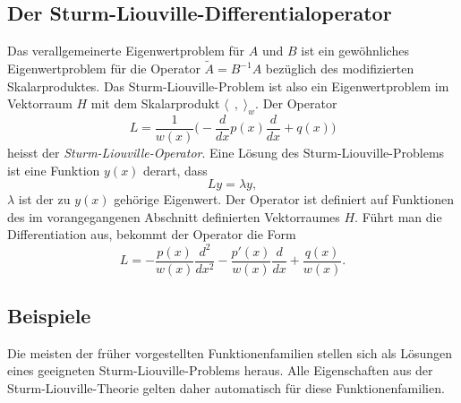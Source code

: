 %
%
\subsection{Der Sturm-Liouville-Differentialoperator}
Das verallgemeinerte Eigenwertproblem für $A$ und $B$ ist ein
gewöhnliches Eigenwertproblem für die Operator $\tilde{A}=B^{-1}A$
bezüglich des modifizierten Skalarproduktes.
Das Sturm-Liouville-Problem ist also ein Eigenwertproblem im
Vektorraum $H$ mit dem Skalarprodukt $\langle\,\;,\;\rangle_w$.
Der Operator
\begin{equation}
L = \frac{1}{w(x)} \biggl(-\frac{d}{dx} p(x)\frac{d}{dx} + q(x)\biggr)
\label{buch:orthogonal:sturm-liouville:opL1}
\end{equation}
heisst der {\em Sturm-Liouville-Operator}.
%
%
Eine Lösung des Sturm-Liouville-Problems ist eine Funktion $y(x)$ derart,
dass 
\[
Ly = \lambda y,
\]
$\lambda$ ist der zu $y(x)$ gehörige Eigenwert.
Der Operator ist definiert auf Funktionen des im vorangegangenen Abschnitt
definierten Vektorraumes $H$.
Führt man die Differentiation aus, bekommt der Operator die Form
\begin{equation}
L
=
-\frac{p(x)}{w(x)} \frac{d^2}{dx^2}
-\frac{p'(x)}{w(x)} \frac{d}{dx}
+\frac{q(x)}{w(x)}.
\label{buch:orthogonal:sturm-liouville:opL2}
\end{equation}

%
%
\subsection{Beispiele\label{sub:beispiele_sturm_liouville_problem}}
Die meisten der früher vorgestellten Funktionenfamilien stellen sich
als Lösungen eines geeigneten Sturm-Liouville-Problems heraus.
Alle Eigenschaften aus der Sturm-Liouville-Theorie gelten daher
automatisch für diese Funktionenfamilien.

%
%
